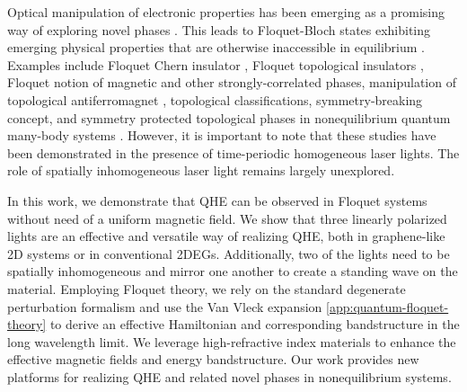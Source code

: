 Optical manipulation of electronic properties has been emerging as a promising way of exploring novel phases \cite{AKA, JHM}.
This leads to Floquet-Bloch states exhibiting emerging physical properties that are otherwise inaccessible in equilibrium \cite{LST}.
Examples include Floquet Chern insulator \cite{AGG}, Floquet topological insulators \cite{rudnerBandStructureEngineering2020}, Floquet notion of magnetic and other strongly-correlated phases\cite{rudnerBandStructureEngineering2020}, manipulation of topological antiferromagnet \cite{bielinskiFloquetBlochManipulation2025}, topological classifications, symmetry-breaking concept, and symmetry protected topological phases in nonequilibrium quantum many-body systems \cite{EKM, rudnerBandStructureEngineering2020}.
However, it is important to note that these studies have been demonstrated in the presence of time-periodic homogeneous laser lights.
The role of spatially inhomogeneous laser light \cite{SWP1, SWP2, SWP3, SWP4, SWP5} remains largely unexplored.

In this work, we demonstrate that QHE can be observed in Floquet systems without need of a uniform magnetic field.
We show that three linearly polarized lights are an effective and versatile way of realizing QHE, both in graphene-like 2D systems or in conventional 2DEGs.
Additionally, two of the lights need to be spatially inhomogeneous and mirror one another to create a standing wave on the material.
Employing Floquet theory, we rely on the standard degenerate perturbation formalism and use the Van Vleck expansion \ref{app:quantum-floquet-theory} \cite{MBL, AEE} to derive an effective Hamiltonian and corresponding bandstructure in the long wavelength limit.
We leverage high-refractive index materials \cite{shimFundamentalLimitsRefractive2021} to enhance the effective magnetic fields and energy bandstructure.
Our work provides new platforms for realizing QHE and related novel phases in nonequilibrium systems.

